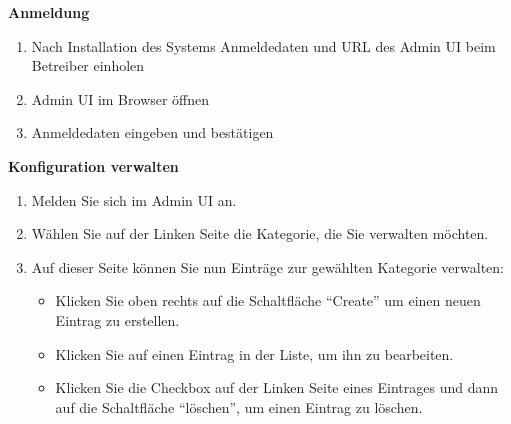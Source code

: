 \textbf{Anmeldung}

\begin{enumerate}
    \item Nach Installation des Systems Anmeldedaten und URL des Admin UI beim Betreiber einholen
    \item Admin UI im Browser öffnen
    \item Anmeldedaten eingeben und bestätigen
\end{enumerate}

\textbf{Konfiguration verwalten}
\begin{enumerate}
    \item Melden Sie sich im Admin UI an.
    \item Wählen Sie auf der Linken Seite die Kategorie, die Sie verwalten möchten.
    \item Auf dieser Seite können Sie nun Einträge zur gewählten Kategorie verwalten:
    \begin{itemize}
        \item Klicken Sie oben rechts auf die Schaltfläche ``Create'' um einen neuen Eintrag zu erstellen.
        \item Klicken Sie auf einen Eintrag in der Liste, um ihn zu bearbeiten.
        \item Klicken Sie die Checkbox auf der Linken Seite eines Eintrages und dann auf die Schaltfläche ``löschen'', um einen Eintrag zu löschen.
    \end{itemize}
\end{enumerate}

